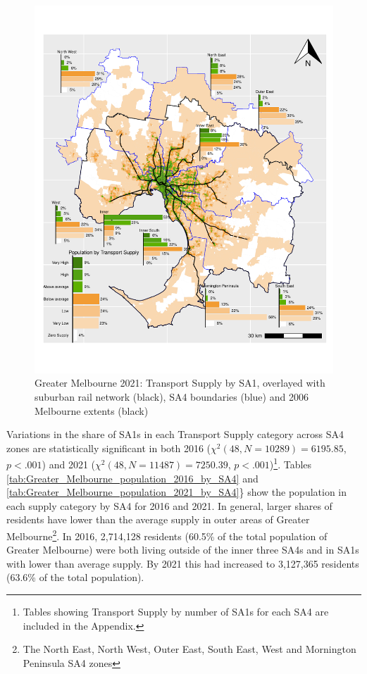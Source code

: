 \documentclass[preprint, 3p,
authoryear]{elsarticle} %
\begin{document}
\begin{figure}
\includegraphics[width=1\linewidth]{ReynoldsCurrieQu2024_files/figure-latex/Greater_Melbourne_population_2021_by_SA4-1} \caption{Greater Melbourne 2021: Transport Supply by SA1,  overlayed with suburban rail network (black), SA4 boundaries (blue) and 2006 Melbourne extents (black)}\label{fig:Greater_Melbourne_population_2021_by_SA4}
\end{figure}

Variations in the share of SA1s in each Transport Supply category across
SA4 zones are statistically significant in both 2016
(\(\chi^2(48, N = 10289) = 6195.85\), \(p < .001\)) and 2021
(\(\chi^2(48, N = 11487) = 7250.39\), \(p < .001\))\footnote{Tables
  showing Transport Supply by number of SA1s for each SA4 are included
  in the Appendix.}. Tables
\ref{tab:Greater_Melbourne_population_2016_by_SA4} and
\ref{tab:Greater_Melbourne_population_2021_by_SA4}\} show the population
in each supply category by SA4 for 2016 and 2021. In general, larger
shares of residents have lower than the average supply in outer areas of
Greater Melbourne\footnote{The North East, North West, Outer East, South
  East, West and Mornington Peninsula SA4 zones}. In 2016, 2,714,128
residents (60.5\% of the total population of Greater Melbourne) were
both living outside of the inner three SA4s and in SA1s with lower than
average supply. By 2021 this had increased to 3,127,365 residents
(63.6\% of the total population).
\end{document}
